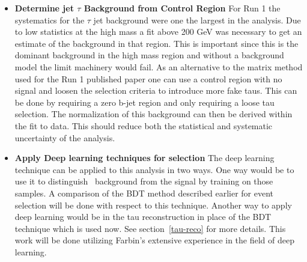 \begin{itemize}[noitemsep,nolistsep,leftmargin=*]
\item[]{{\bf Determine jet \too $\tau$ Background from Control Region}  %
For Run 1 the systematics for the $\tau$ \too jet background were one the largest in the analysis.  Due to low statistics at the high mass a fit above 200 GeV was necessary to get 
an estimate of the background in that region.  This is important since this is the dominant background in the high mass region and without a background model the limit machinery would fail.
As an alternative to the matrix method used for the Run 1 published paper one can use a control region with no signal and loosen the selection criteria to introduce more fake taus.  This can be done
by requiring a zero b-jet region and only requiring a loose tau selection.  The normalization of this background can then be derived within the fit to data.  This should reduce both the statistical and systematic uncertainty of the analysis.}

\item[]{{\bf Apply Deep learning techniques for selection}
The deep learning technique can be applied to this analysis in two ways.  One way would be to use it to distinguish \ttbar\ background from the signal by training on those samples.
A comparison of the BDT method described earlier for event selection will be done with respect to this technique.
Another way to apply deep learning would be in the tau reconstruction in place of the BDT technique which is used now. See section~\ref{tau-reco} for more details.
This work will be done utilizing Farbin's extensive experience in the field of deep learning.}




\end{itemize}
